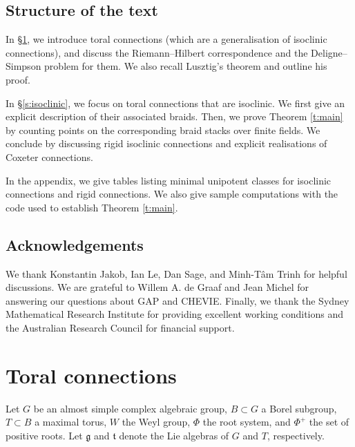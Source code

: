 \documentclass[11pt]{amsart}
\theoremstyle{definition}
\newcommand{\ft}{\mathfrak{t}}
\newcommand{\fg}{\mathfrak{g}}
\begin{document}
\subsection{Structure of the text}
In \S \ref{s:Toral}, we introduce toral connections (which are a generalisation of isoclinic connections), and discuss the Riemann--Hilbert correspondence and the Deligne--Simpson problem for them. We also recall Lusztig's theorem and outline his proof. 

In \S \ref{s:isoclinic}, we focus on toral connections that are isoclinic. We first give an explicit description of their associated braids. Then, we prove Theorem \ref{t:main} by counting points on the corresponding braid stacks over finite fields. We conclude by discussing rigid isoclinic connections and explicit realisations of Coxeter connections. 

In the appendix, we give tables listing minimal unipotent classes for isoclinic connections and rigid connections. We also give sample computations with the code used to establish Theorem \ref{t:main}. 



\subsection{Acknowledgements} We thank Konstantin Jakob, Ian Le, Dan Sage,  and Minh-T\^{a}m Trinh for helpful discussions. 
We are grateful to Willem A. de Graaf and Jean Michel for answering our questions about GAP and CHEVIE. Finally, we thank the Sydney Mathematical Research Institute for providing excellent working conditions and the Australian Research Council for financial support. 

















\section{Toral connections} \label{s:Toral}

Let $G$ be an almost simple complex algebraic group, $B\subset G$ a Borel subgroup, $T\subset B$ a maximal torus, $W$ the Weyl group, $\Phi$ the root system, and $\Phi^+$ the set of positive roots. Let $\fg$ and $\ft$ denote the Lie algebras of $G$ and $T$, respectively.
\end{document}

